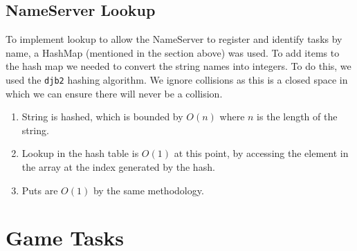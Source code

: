 \documentclass[12pt]{article}
\begin{document}
\subsection{NameServer Lookup}
To implement lookup to allow the NameServer to register and identify tasks by name, a HashMap (mentioned in the section above) was used.  To add items to the hash map we needed to convert the string names into integers.  To do this, we used the \texttt{djb2} hashing algorithm.  We ignore collisions as this is a closed space in which we can ensure there will never be a collision.
\begin{enumerate}
  \item String is hashed, which is bounded by $O(n)$ where $n$ is the length of the string.
  \item Lookup in the hash table is $O(1)$ at this point, by accessing the element in the array at the index generated by the hash.
  \item Puts are $O(1)$ by the same methodology.
    \\[2\baselineskip]
\end{enumerate}

\section{Game Tasks}
\end{document}
